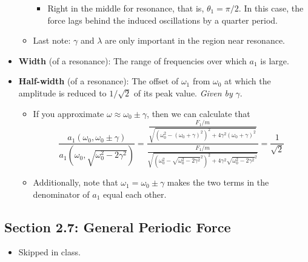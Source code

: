 \documentclass[../notes.tex]{subfiles}
\begin{document}
\begin{itemize}
\begin{itemize}
\begin{itemize}
            \item Right in the middle for resonance, that is, $\theta_1=\pi/2$. In this case, the force lags behind the induced oscillations by a quarter period.
        \end{itemize}
        \item Last note: $\gamma$ and $\lambda$ are only important in the region near resonance.
    \end{itemize}
    \item \textbf{Width} (of a resonance): The range of frequencies over which $a_1$ is large.
    \item \textbf{Half-width} (of a resonance): The offset of $\omega_1$ from $\omega_0$ at which the amplitude is reduced to $1/\sqrt{2}$ of its peak value. \emph{Given by} $\gamma$.
    \begin{itemize}
        \item If you approximate $\omega\approx\omega_0\pm\gamma$, then we can calculate that
        \begin{equation*}
            \frac{a_1(\omega_0,\omega_0\pm\gamma)}{a_1(\omega_0,\sqrt{\omega_0^2-2\gamma^2})} = \frac{\frac{F_1/m}{\sqrt{(\omega_0^2-(\omega_0+\gamma)^2)^2+4\gamma^2(\omega_0+\gamma)^2}}}{\frac{F_1/m}{\sqrt{\left( \omega_0^2-\sqrt{\omega_0^2-2\gamma^2}^2 \right)^2+4\gamma^2\sqrt{\omega_0^2-2\gamma^2}^2}}}
            = \frac{1}{\sqrt{2}}
        \end{equation*}
        \item Additionally, note that $\omega_1=\omega_0\pm\gamma$ makes the two terms in the denominator of $a_1$ equal each other.
    \end{itemize}
\end{itemize}


\subsection*{Section 2.7: General Periodic Force}
\begin{itemize}
    \item {}Skipped in class.
\end{itemize}
\end{document}
